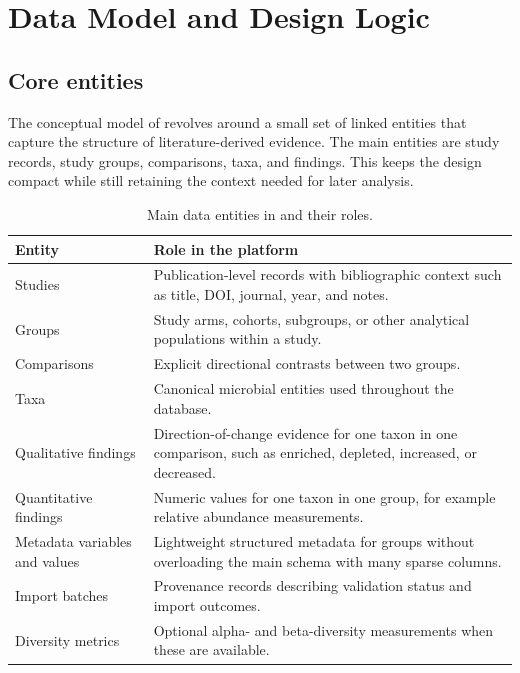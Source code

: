 \section{Data Model and Design Logic}

\subsection{Core entities}

The conceptual model of \projectname{} revolves around a small set of linked entities that capture the structure of literature-derived evidence. The main entities are study records, study groups, comparisons, taxa, and findings. This keeps the design compact while still retaining the context needed for later analysis.

\begin{table}[htbp]
    \centering
    \small
    \caption{Main data entities in \projectname{} and their roles.}
    \label{tab:entities}
    \begin{tabularx}{0.98\linewidth}{>{\raggedright\arraybackslash}p{3.8cm} >{\raggedright\arraybackslash}X}
        \toprule
        \textbf{Entity} & \textbf{Role in the platform} \\
        \midrule
        Studies & Publication-level records with bibliographic context such as title, DOI, journal, year, and notes. \\
        Groups & Study arms, cohorts, subgroups, or other analytical populations within a study. \\
        Comparisons & Explicit directional contrasts between two groups. \\
        Taxa & Canonical microbial entities used throughout the database. \\
        Qualitative findings & Direction-of-change evidence for one taxon in one comparison, such as enriched, depleted, increased, or decreased. \\
        Quantitative findings & Numeric values for one taxon in one group, for example relative abundance measurements. \\
        Metadata variables and values & Lightweight structured metadata for groups without overloading the main schema with many sparse columns. \\
        Import batches & Provenance records describing validation status and import outcomes. \\
        Diversity metrics & Optional alpha- and beta-diversity measurements when these are available. \\
        \bottomrule
    \end{tabularx}
\end{table}

